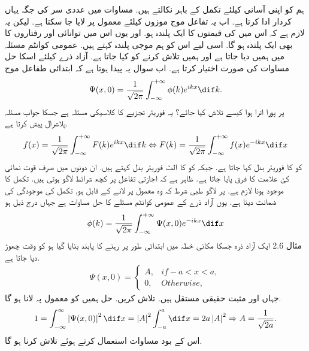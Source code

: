 
ہم  کو اپنی آسانی کیلئے تکمل کے باہر نکالتے ہیں. مساوات  میں عددی سر  کی جگہ یہاں  کردار ادا کرتا ہے. اب یہ تفاعل موج موزوں  کیلئے معمول پر لایا جا سکتا ہے. لیکن یہ لازم ہے کہ اس میں  کی قیمتوں کا ایک پلندہ ہو. اور یوں اس میں توانائی اور رفتاروں کا بھی ایک پلندہ ہو گا. اسی لیے اس کو ہم موجی پلندہ کہتے ہیں. 
عمومی کوانٹم مسئلہ میں ہمیں  دیا جاتا ہے اور ہمیں  تلاش کرنے کو کیا جاتا ہے. آزاد ذرے کیلئے اسکا حل مساوات  کی صورت اختیار کرتا ہے. اب سوال یہ پیدا ہوتا ہے کہ ابتدائی طفاعل موج 
\begin{align}
\Psi (x,0) = \frac{1}{\sqrt{2\pi}} \int_{- \infty}^{+ \infty} \phi (k) e^{ikx} \dif k. 
\end{align}
پر پورا اترا ہوا  کیسے تلاش کیا جائے؟ 
یہ فوریئر تجزیے کا کلاسیکی مسئلہ ہے جسکا جواب مسئلہ پلاشرال پیش کرتا ہے. 
\begin{align}
f(x) = \frac{1}{\sqrt{2\pi}} \int_{- \infty}^{+ \infty} F(k) e^{ikx} \dif k \Leftrightarrow F(k) = \frac{1}{\sqrt{2\pi}} \int_{- \infty}^{+ \infty} f(x) e^{-ikx} \dif x
\end{align}
 کو  کا فوریئر بدل کہا جاتا ہے. جبکہ  کو  کا الٹ فوریئر بدل کہتے ہیں. ان دونوں میں صرف قوت نمائی کئ علامت کا فرق پایا جاتا ہے. ظاہر ہے کہ اجازتی تفاعل پر کچھ شرائط لاگو ہوتی ہیں. تکمل کا موجود ہونا لازم ہے.  پر لاگو طبی شرط کہ وہ معمول پر لانے کے قابل ہو, تکمل کی موجودگی کی ضمانت دیتا ہے. یوں آزاد ذرے کے عمومی کوانٹم مسئلے کا حل مساوات  ہے جہاں درج ذیل ہو 
\begin{align}
\phi(k) = \frac{1}{\sqrt{2\pi}} \int_{- \infty}^{+\infty} \Psi(x,0)e^{-ikx} \dif x
\end{align}
مثال 2.6
ایک آزاد ذرہ جسکا مکانی خطہ  میں ابتدائی طور پر رہنے کا پابند بنایا گیا ہو کو وقت  چھوڑ دیا جاتا ہے. 
\begin{align*}
\Psi (x,0) = \left\{ \begin{array}{lc}
A, & if -a < x < a, \\ 0, & Otherwise,
\end{array} \right.
\end{align*}
جہاں  اور  مثبت حقیقی مستقل ہیں.  تلاش کریں. 
حل 
ہمیں  کو معمول پہ لانا ہو گا. 
\begin{align*}
1 = \int_{-\infty}^{\infty} \left| \Psi (x,0) \right| ^{2} \dif x = \left| A \right|^{2} \int_{-a}^{a} \dif x = 2a \left| A \right|^{2} \Rightarrow A = \frac{1}{\sqrt{2a}}.
\end{align*}
اس کے بود مساوات  استعمال کرتے ہوئے   تلاش کرنا ہو گا.


